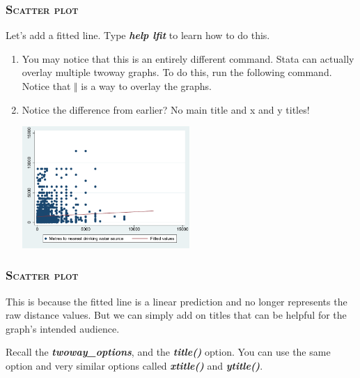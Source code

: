 \documentclass[10pt]{beamer}
\begin{document}
	\begin{frame}
	\frametitle{\textsc{Scatter plot}}	
		 Let's add a fitted line. Type \textbf{\textit{help lfit}} to learn how to do this.
		\begin{enumerate}
			  \item You may notice that this is an entirely different command. 
								Stata can actually overlay multiple twoway graphs. 
								To do this, run the following command.
								Notice that \textbf{$\Vert$} is a way to overlay the graphs.
		
\begin{stlog}\end{stlog}
			\vspace{1mm}
			 \item Notice the difference from earlier? No main title and x and y titles!
			\vspace{1mm}
		
\begin{center}
    \includegraphics[width=0.5\textwidth]{scatter_3.pdf}
\end{center}
		\end{enumerate}
	\end{frame}

	\begin{frame}
	\frametitle{\textsc{Scatter plot}}	
		 This is because the fitted line is a linear prediction and 
					 no longer represents the raw distance values. 
					 But we can simply add on titles that can be helpful for the graph's intended audience.
		
		 Recall the \textbf{\textit{twoway\_options}}, and the \textbf{\textit{title()}} option.
								You can use the same option and very similar options called \textbf{\textit{xtitle()}} and
								\textbf{\textit{ytitle()}}.
		
\begin{stlog}\end{stlog}
	\end{frame}
	
\end{document}
